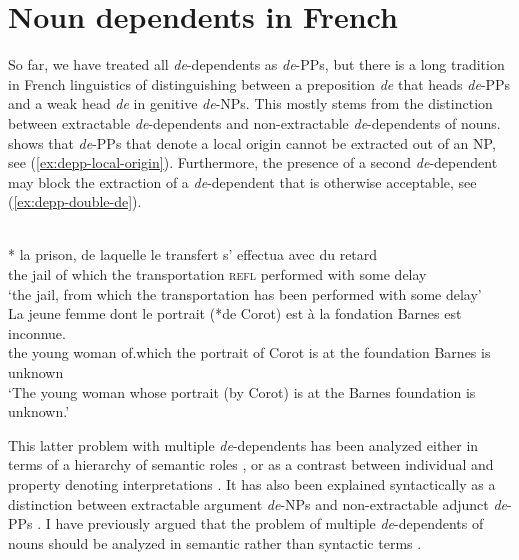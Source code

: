 \section{Noun dependents in French}
\label{ch:hpsg-prep}

So far, we have treated all \emph{de}-dependents as \emph{de}-PPs, but there is a long tradition in French linguistics of distinguishing between a preposition \emph{de} that heads \emph{de}-PPs and a weak head \emph{de} in genitive \emph{de}-NPs. This mostly stems from the distinction between extractable \emph{de}-dependents and non-extractable \emph{de}-dependents of nouns. \citet{Sportiche.1981} shows that \emph{de}-PPs that denote a local origin cannot be extracted out of an NP, see (\ref{ex:depp-local-origin}). Furthermore, the presence of a second \emph{de}-dependent may block the extraction of a \emph{de}-dependent that is otherwise acceptable, see (\ref{ex:depp-double-de}).\largerpage 

\eal 
\ex \citep[adapted from][225]{Sportiche.1981}\\
* \gll la prison, de laquelle le transfert s' effectua avec du retard\\
the jail of which the transportation \textsc{refl} performed with some delay\\
\glt `the jail, from which the transportation has been performed with some delay'
\label{ex:depp-local-origin}
\ex \citep[63]{Godard.1996}\\
\gll La jeune femme dont le portrait (*de Corot) est à la fondation Barnes est
inconnue.\\
the young woman of.which the portrait \hspace{10pt}of Corot is at the foundation Barnes is unknown\\
\glt `The young woman whose portrait (by Corot) is at the Barnes foundation is unknown.'
\label{ex:depp-double-de}
\zl 

This latter problem with multiple \emph{de}-dependents has been analyzed either in terms of a hierarchy of semantic roles \citep{Sag.1994.Godard,Godard.1996}, or as a contrast between individual and property denoting interpretations \citep{Kolliakou.1999,Mensching.2018}. It has also been explained syntactically as a distinction between extractable argument \emph{de}-NPs and non-extractable adjunct \emph{de}-PPs \citep{Kolliakou.1999}. I have previously argued that the problem of multiple \emph{de}-dependents of nouns should be analyzed in semantic rather than syntactic terms \citep{MyP.2015}.

